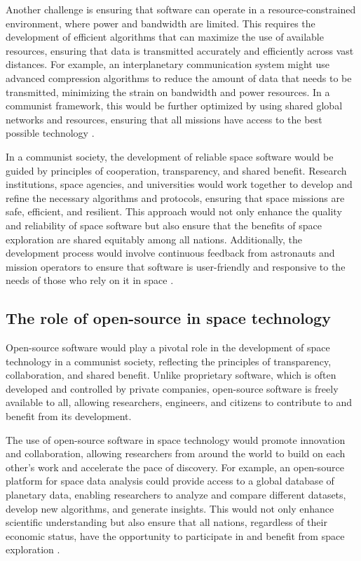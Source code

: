Another challenge is ensuring that software can operate in a resource-constrained environment, where power and bandwidth are limited. This requires the development of efficient algorithms that can maximize the use of available resources, ensuring that data is transmitted accurately and efficiently across vast distances. For example, an interplanetary communication system might use advanced compression algorithms to reduce the amount of data that needs to be transmitted, minimizing the strain on bandwidth and power resources. In a communist framework, this would be further optimized by using shared global networks and resources, ensuring that all missions have access to the best possible technology \cite[pp.~300-302]{smith2024}.

In a communist society, the development of reliable space software would be guided by principles of cooperation, transparency, and shared benefit. Research institutions, space agencies, and universities would work together to develop and refine the necessary algorithms and protocols, ensuring that space missions are safe, efficient, and resilient. This approach would not only enhance the quality and reliability of space software but also ensure that the benefits of space exploration are shared equitably among all nations. Additionally, the development process would involve continuous feedback from astronauts and mission operators to ensure that software is user-friendly and responsive to the needs of those who rely on it in space \cite[pp.~78-81]{bookchin1986}.

\subsection{The role of open-source in space technology}

Open-source software would play a pivotal role in the development of space technology in a communist society, reflecting the principles of transparency, collaboration, and shared benefit. Unlike proprietary software, which is often developed and controlled by private companies, open-source software is freely available to all, allowing researchers, engineers, and citizens to contribute to and benefit from its development.

The use of open-source software in space technology would promote innovation and collaboration, allowing researchers from around the world to build on each other's work and accelerate the pace of discovery. For example, an open-source platform for space data analysis could provide access to a global database of planetary data, enabling researchers to analyze and compare different datasets, develop new algorithms, and generate insights. This would not only enhance scientific understanding but also ensure that all nations, regardless of their economic status, have the opportunity to participate in and benefit from space exploration \cite[pp.~180-183]{gramsci1971}.

